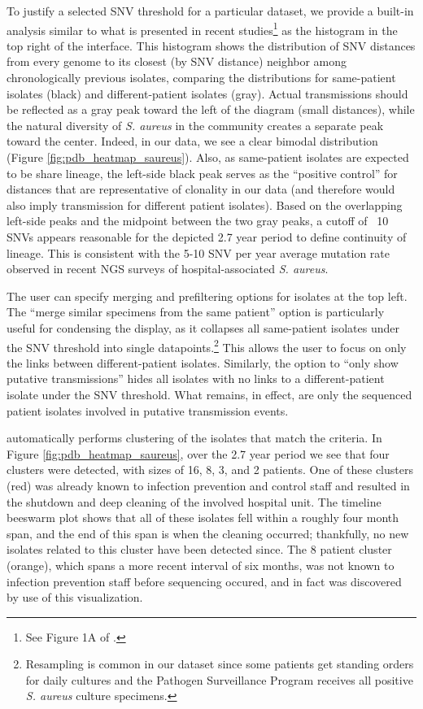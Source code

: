 To justify a selected SNV threshold for a particular dataset, we provide a built-in analysis similar to what is presented in recent studies\footnote{See Figure 1A of \textcite{Eyre2013}.} as the histogram in the top right of the interface. This histogram shows the distribution of SNV distances from every genome to its closest (by SNV distance) neighbor among chronologically previous isolates, comparing the distributions for same-patient isolates (black) and different-patient isolates (gray). Actual transmissions should be reflected as a gray peak toward the left of the diagram (small distances), while the natural diversity of \emph{S. aureus} in the community creates a separate peak toward the center. Indeed, in our data, we see a clear bimodal distribution (Figure \ref{fig:pdb_heatmap_saureus}). Also, as same-patient isolates are expected to be share lineage, the left-side black peak serves as the ``positive control'' for distances that are representative of clonality in our data (and therefore would also imply transmission for different patient isolates). Based on the overlapping left-side peaks and the midpoint between the two gray peaks, a cutoff of ~10 SNVs appears reasonable for the depicted 2.7 year period to define continuity of lineage. This is consistent with the 5-10 SNV per year average mutation rate observed in recent NGS surveys of hospital-associated \emph{S. aureus}.\autocite{Price2014,Harris2013}

The user can specify merging and prefiltering options for isolates at the top left. The ``merge similar specimens from the same patient'' option is particularly useful for condensing the display, as it collapses all same-patient isolates under the SNV threshold into single datapoints.\footnote{Resampling is common in our dataset since some patients get standing orders for daily cultures and the Pathogen Surveillance Program receives all positive \emph{S. aureus} culture specimens.} This allows the user to focus on only the links between different-patient isolates. Similarly, the option to ``only show putative transmissions'' hides all isolates with no links to a different-patient isolate under the SNV threshold. What remains, in effect, are only the sequenced patient isolates involved in putative transmission events.

\pathogendbviz{} automatically performs clustering of the isolates that match the criteria. In Figure \ref{fig:pdb_heatmap_saureus}, over the 2.7 year period we see that four clusters were detected, with sizes of 16, 8, 3, and 2 patients. One of these clusters (red) was already known to infection prevention and control staff and resulted in the shutdown and deep cleaning of the involved hospital unit. The timeline beeswarm plot shows that all of these isolates fell within a roughly four month span, and the end of this span is when the cleaning occurred; thankfully, no new isolates related to this cluster have been detected since. The 8 patient cluster (orange), which spans a more recent interval of six months, was not known to infection prevention staff before sequencing occured, and in fact was discovered by use of this visualization.

